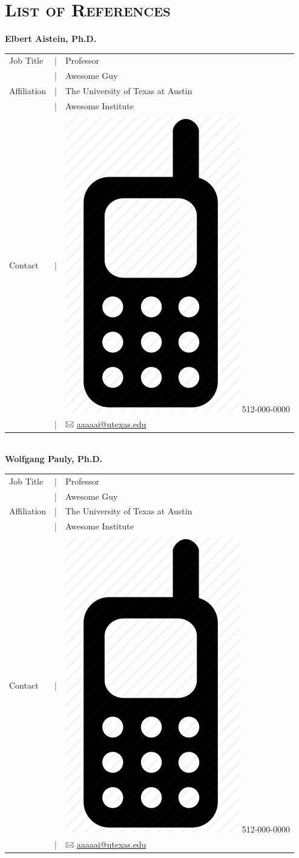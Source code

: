 \pagestyle{RL}
\section*{\textsc{\textcolor{Burnt Orange}{List of References}}\hrulefill}
\textbf{Elbert Aistein, Ph.D.}\\[1.5mm]
\begin{tabular}{>{\raggedleft}p{18mm}cl}
	Job Title & \textcolor{Burnt Orange}{|} & Professor \\
	          & \textcolor{Burnt Orange}{|} & Awesome Guy \\
	Affiliation & \textcolor{Burnt Orange}{|} & The University of Texas at Austin \\
	            & \textcolor{Burnt Orange}{|} & Awesome Institute \\
	Contact & \textcolor{Burnt Orange}{|} & \includegraphics[width=1ex]{figures/icon_mobile_phone.png} 512-000-0000 \\
			& \textcolor{Burnt Orange}{|} & \includegraphics[width=1em]{figures/icon_email.jpg} \href{mailto:aaaaa@utexas.edu}{aaaaai@utexas.edu} \\
\end{tabular}\\[3mm]
\textbf{Wolfgang Pauly, Ph.D.}\\[1.5mm]
\begin{tabular}{>{\raggedleft}p{18mm}cl}
	Job Title & \textcolor{Burnt Orange}{|} & Professor \\
	          & \textcolor{Burnt Orange}{|} & Awesome Guy \\
	Affiliation & \textcolor{Burnt Orange}{|} & The University of Texas at Austin \\
	            & \textcolor{Burnt Orange}{|} & Awesome Institute \\
	Contact & \textcolor{Burnt Orange}{|} & \includegraphics[width=1ex]{figures/icon_mobile_phone.png} 512-000-0000 \\
			& \textcolor{Burnt Orange}{|} & \includegraphics[width=1em]{figures/icon_email.jpg} \href{mailto:aaaaa@utexas.edu}{aaaaai@utexas.edu} \\
\end{tabular}\\[3mm]